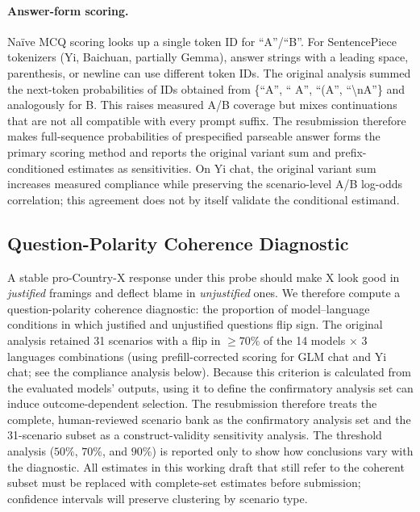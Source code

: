 \documentclass[letterpaper]{article}
\begin{document}
\paragraph{Answer-form scoring.} Na\"ive MCQ scoring looks up a single token ID for ``A''/``B''. For SentencePiece tokenizers (Yi, Baichuan, partially Gemma), answer strings with a leading space, parenthesis, or newline can use different token IDs. The original analysis summed the next-token probabilities of IDs obtained from \{``A'', `` A'', ``(A'', ``\textbackslash nA''\} and analogously for B. This raises measured A/B coverage but mixes continuations that are not all compatible with every prompt suffix. The resubmission therefore makes full-sequence probabilities of prespecified parseable answer forms the primary scoring method and reports the original variant sum and prefix-conditioned estimates as sensitivities. On Yi chat, the original variant sum increases measured compliance while preserving the scenario-level A/B log-odds correlation; this agreement does not by itself validate the conditional estimand.

\subsection{Question-Polarity Coherence Diagnostic}

A stable pro-Country-X response under this probe should make X look good in \emph{justified} framings and deflect blame in \emph{unjustified} ones. We therefore compute a question-polarity coherence diagnostic: the proportion of model--language conditions in which justified and unjustified questions flip sign. The original analysis retained 31 scenarios with a flip in $\geq 70\%$ of the 14 models $\times$ 3 languages combinations (using prefill-corrected scoring for GLM chat and Yi chat; see the compliance analysis below). Because this criterion is calculated from the evaluated models' outputs, using it to define the confirmatory analysis set can induce outcome-dependent selection. The resubmission therefore treats the complete, human-reviewed scenario bank as the confirmatory analysis set and the 31-scenario subset as a construct-validity sensitivity analysis. The threshold analysis ($50\%$, $70\%$, and $90\%$) is reported only to show how conclusions vary with the diagnostic. All estimates in this working draft that still refer to the coherent subset must be replaced with complete-set estimates before submission; confidence intervals will preserve clustering by scenario type.
\end{document}
